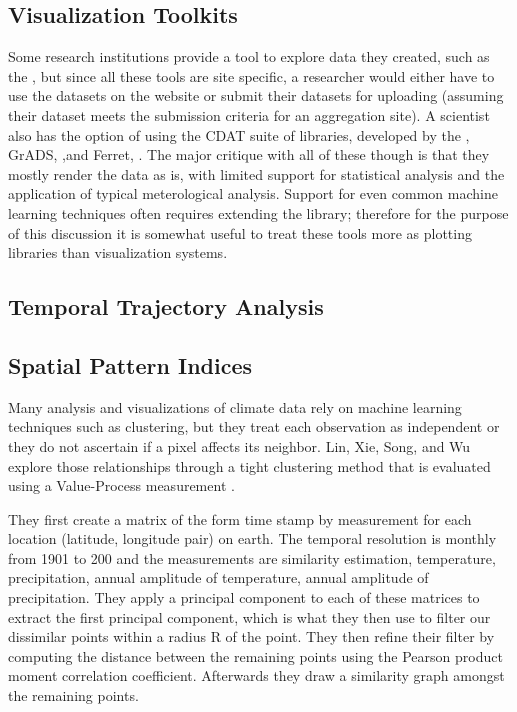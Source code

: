 \documentclass[letterpaper,onecolumn,titlepage]{Ythesis}
\begin{document}
\subsection{Visualization Toolkits}
Some research institutions provide a tool to explore data they created, such as the \cite{src:esrlpsd}, but since all these tools are site specific, a researcher would either have to use the datasets on the website or submit their datasets for uploading 
(assuming their dataset meets the submission criteria for an aggregation site). A scientist also has the option of using the CDAT suite of libraries, developed by the \cite{WilliamsEtAl13}, GrADS, \cite{src:grads},and Ferret, \cite{src:HankinEtAl96}. The major critique with all of these though is that they mostly render the data as is, with limited support for statistical analysis and the application of typical meterological analysis. Support for even common machine learning techniques often requires extending the library; therefore for the purpose of this discussion it is somewhat useful to treat these tools more as plotting libraries than visualization systems. %


\subsection{Temporal Trajectory Analysis}
\subsection{Spatial Pattern Indices}

Many analysis and visualizations of climate data rely on machine learning techniques such as clustering, but they treat each observation as independent or they do not ascertain if a pixel affects its neighbor. Lin, Xie, Song, and Wu explore those relationships through a tight clustering method that is evaluated using a Value-Process measurement  \cite{LinXieSongWu09}. 

They first create a matrix of the form time stamp by measurement for each location (latitude, longitude pair) on earth. The temporal resolution is monthly from 1901 to 200 and the measurements are similarity estimation, temperature, precipitation, annual amplitude of temperature, annual amplitude of precipitation. They apply a principal component to each of these matrices to extract the first principal component, which is what they then use to filter our dissimilar points within a radius R of the point. They then refine their filter by computing the distance between the remaining points using the Pearson product moment correlation coefficient. Afterwards they draw a similarity graph amongst the remaining points. 
\end{document}
